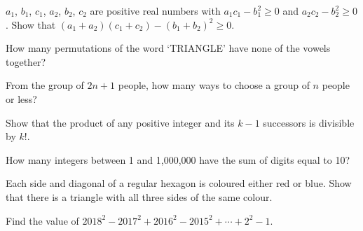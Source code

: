 \begin{problems}
    \problem $a_{1}$, $b_{1}$, $c_{1}$, $a_{2}$, $b_{2}$, $c_{2}$ are positive
    real numbers with $a_{1}c_{1} - b_{1}^2 \geq 0$ and $a_{2}c_{2} - b_{2}^2
    \geq 0$. Show that $(a_{1} + a_{2})(c_{1} + c_{2}) - (b_{1} + b_{2})^2 \geq
    0$. 
    
    \problem How many permutations of the word `TRIANGLE' have none of the
    vowels together?
    
    \problem From the group of $2n + 1$ people, how many ways to choose a group
    of $n$ people or less?
    
    \problem Show that the product of any positive integer and its $k - 1$
    successors is divisible by $k!$. 
    
    \problem How many integers between 1 and 1,000,000 have the sum of digits
    equal to 10?
    
    \problem Each side and diagonal of a regular hexagon is coloured either red
    or blue. Show that there is a triangle with all three sides of the same
    colour. 
    
    \problem Find the value of $2018^2 - 2017^2 + 2016^2 - 2015^2 + \cdots +
    2^2 - 1$.
\end{problems}
